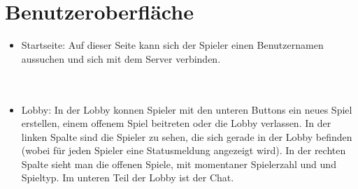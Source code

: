 \documentclass{article}
\begin{document}
\section{Benutzeroberfläche}
\begin{itemize}
	\item Startseite:  Auf dieser Seite kann sich der Spieler einen Benutzernamen aussuchen und sich mit dem Server verbinden.\\ 				\ \\
		\ \\
	\item \gls{Lobby}: In der \gls{Lobby} konnen Spieler mit den unteren Buttons ein neues Spiel erstellen,  einem offenem Spiel 					beitreten oder die \gls{Lobby} verlassen. In der linken Spalte sind die Spieler zu sehen, die sich gerade in der 					\gls{Lobby} befinden (wobei für jeden Spieler eine Statusmeldung angezeigt wird). In der rechten Spalte sieht 					man die offenen Spiele, mit momentaner Spielerzahl und und Spieltyp. Im unteren Teil der Lobby ist der Chat.\\
		\ \\

\end{itemize}
\end{document}
